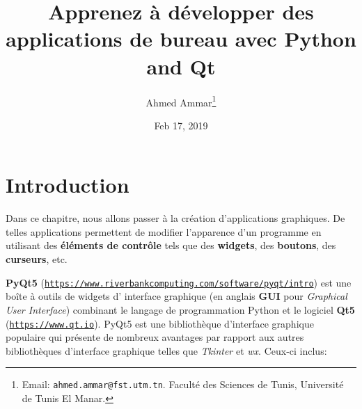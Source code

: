 \documentclass[%
oneside,                 %
final,                   %
10pt,french]{article}
\begin{document}

\newcommand{\exercisesection}[1]{\subsection*{#1}}






\title{Apprenez à développer des applications de bureau avec Python and Qt}


\author{Ahmed Ammar\footnote{Email: \texttt{ahmed.ammar@fst.utm.tn}. Faculté des Sciences de Tunis, Université de Tunis El Manar.}}


\date{Feb 17, 2019}
\maketitle

\tableofcontents


\vspace{1cm} %




\section{Introduction}
Dans ce chapitre, nous allons passer à la création d’applications graphiques. De telles applications permettent de modifier l'apparence d'un programme en utilisant des \textbf{éléments de contrôle} tels que des \textbf{widgets}, des \textbf{boutons}, des \textbf{curseurs}, etc.

\textbf{PyQt5} (\href{{https://www.riverbankcomputing.com/software/pyqt/intro}}{\nolinkurl{https://www.riverbankcomputing.com/software/pyqt/intro}}) est une boîte à outils de widgets d' interface graphique (en anglais \textbf{GUI} pour \emph{Graphical User Interface}) combinant le langage de programmation Python et le logiciel \textbf{Qt5} (\href{{https://www.qt.io}}{\nolinkurl{https://www.qt.io}}). PyQt5 est une bibliothèque d'interface graphique populaire qui présente de nombreux avantages par rapport aux autres bibliothèques d'interface graphique telles que \emph{Tkinter} et \emph{wx}. Ceux-ci inclus:
\end{document}
